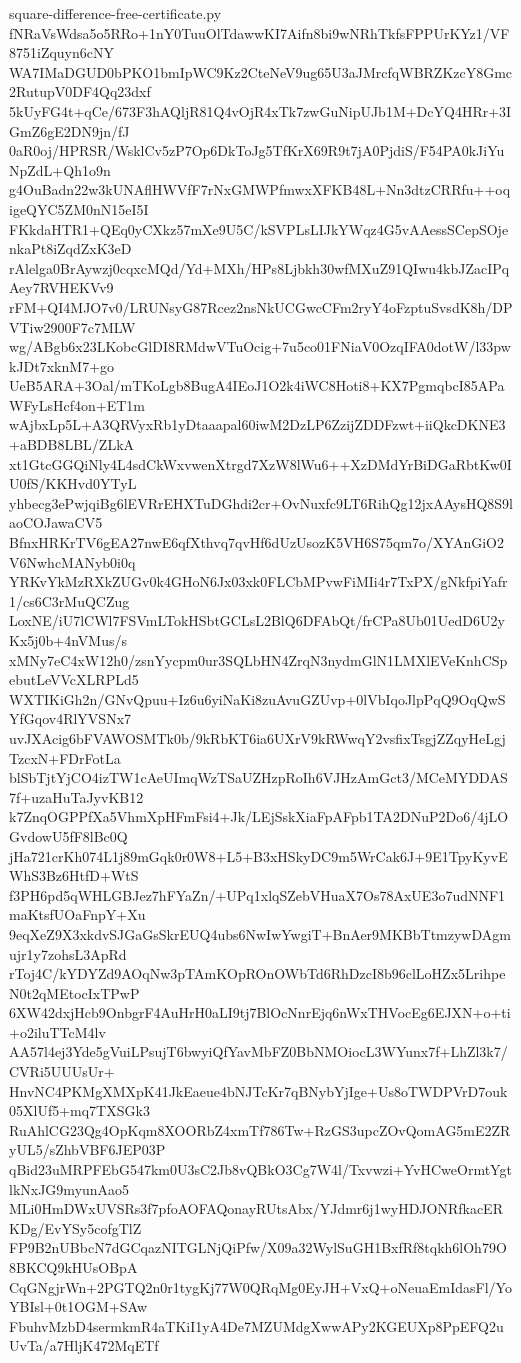 \documentclass[11pt]{article}
\theoremstyle{definition}
\theoremstyle{remark}
\begin{document}
\begin{filecontents*}[overwrite]{square-difference-free-certificate.py}
fNRaVsWdsa5o5RRo+1nY0TuuOlTdawwKI7Aifn8bi9wNRhTkfsFPPUrKYz1/VF8751iZquyn6cNY
WA7IMaDGUD0bPKO1bmIpWC9Kz2CteNeV9ug65U3aJMrcfqWBRZKzcY8Gmc2RutupV0DF4Qq23dxf
5kUyFG4t+qCe/673F3hAQljR81Q4vOjR4xTk7zwGuNipUJb1M+DcYQ4HRr+3IGmZ6gE2DN9jn/fJ
0aR0oj/HPRSR/WsklCv5zP7Op6DkToJg5TfKrX69R9t7jA0PjdiS/F54PA0kJiYuNpZdL+Qh1o9n
g4OuBadn22w3kUNAflHWVfF7rNxGMWPfmwxXFKB48L+Nn3dtzCRRfu++oqigeQYC5ZM0nN15eI5I
FKkdaHTR1+QEq0yCXkz57mXe9U5C/kSVPLsLIJkYWqz4G5vAAessSCepSOjenkaPt8iZqdZxK3eD
rAlelga0BrAywzj0cqxcMQd/Yd+MXh/HPs8Ljbkh30wfMXuZ91QIwu4kbJZacIPqAey7RVHEKVv9
rFM+QI4MJO7v0/LRUNsyG87Rcez2nsNkUCGwcCFm2ryY4oFzptuSvsdK8h/DPVTiw2900F7c7MLW
wg/ABgb6x23LKobcGlDI8RMdwVTuOcig+7u5co01FNiaV0OzqIFA0dotW/l33pwkJDt7xknM7+go
UeB5ARA+3Oal/mTKoLgb8BugA4IEoJ1O2k4iWC8Hoti8+KX7PgmqbcI85APaWFyLsHcf4on+ET1m
wAjbxLp5L+A3QRVyxRb1yDtaaapal60iwM2DzLP6ZzijZDDFzwt+iiQkcDKNE3+aBDB8LBL/ZLkA
xt1GtcGGQiNly4L4sdCkWxvwenXtrgd7XzW8lWu6++XzDMdYrBiDGaRbtKw0IU0fS/KKHvd0YTyL
yhbecg3ePwjqiBg6lEVRrEHXTuDGhdi2cr+OvNuxfc9LT6RihQg12jxAAysHQ8S9laoCOJawaCV5
BfnxHRKrTV6gEA27nwE6qfXthvq7qvHf6dUzUsozK5VH6S75qm7o/XYAnGiO2V6NwhcMANyb0i0q
YRKvYkMzRXkZUGv0k4GHoN6Jx03xk0FLCbMPvwFiMIi4r7TxPX/gNkfpiYafr1/cs6C3rMuQCZug
LoxNE/iU7lCWl7FSVmLTokHSbtGCLsL2BlQ6DFAbQt/frCPa8Ub01UedD6U2yKx5j0b+4nVMus/s
xMNy7eC4xW12h0/zsnYycpm0ur3SQLbHN4ZrqN3nydmGlN1LMXlEVeKnhCSpebutLeVVcXLRPLd5
WXTIKiGh2n/GNvQpuu+Iz6u6yiNaKi8zuAvuGZUvp+0lVbIqoJlpPqQ9OqQwSYfGqov4RlYVSNx7
uvJXAcig6bFVAWOSMTk0b/9kRbKT6ia6UXrV9kRWwqY2vsfixTsgjZZqyHeLgjTzcxN+FDrFotLa
blSbTjtYjCO4izTW1cAeUImqWzTSaUZHzpRoIh6VJHzAmGct3/MCeMYDDAS7f+uzaHuTaJyvKB12
k7ZnqOGPPfXa5VhmXpHFmFsi4+Jk/LEjSskXiaFpAFpb1TA2DNuP2Do6/4jLOGvdowU5fF8lBc0Q
jHa721crKh074L1j89mGqk0r0W8+L5+B3xHSkyDC9m5WrCak6J+9E1TpyKyvEWhS3Bz6HtfD+WtS
f3PH6pd5qWHLGBJez7hFYaZn/+UPq1xlqSZebVHuaX7Os78AxUE3o7udNNF1maKtsfUOaFnpY+Xu
9eqXeZ9X3xkdvSJGaGsSkrEUQ4ubs6NwIwYwgiT+BnAer9MKBbTtmzywDAgmujr1y7zohsL3ApRd
rToj4C/kYDYZd9AOqNw3pTAmKOpROnOWbTd6RhDzcI8b96clLoHZx5LrihpeN0t2qMEtocIxTPwP
6XW42dxjHcb9OnbgrF4AuHrH0aLI9tj7BlOcNnrEjq6nWxTHVocEg6EJXN+o+ti+o2iluTTcM4lv
AA57l4ej3Yde5gVuiLPsujT6bwyiQfYavMbFZ0BbNMOiocL3WYunx7f+LhZl3k7/CVRi5UUUsUr+
HnvNC4PKMgXMXpK41JkEaeue4bNJTcKr7qBNybYjIge+Us8oTWDPVrD7ouk05XlUf5+mq7TXSGk3
RuAhlCG23Qg4OpKqm8XOORbZ4xmTf786Tw+RzGS3upcZOvQomAG5mE2ZRyUL5/sZhbVBF6JEP03P
qBid23uMRPFEbG547km0U3sC2Jb8vQBkO3Cg7W4l/Txvwzi+YvHCweOrmtYgtlkNxJG9myunAao5
MLi0HmDWxUVSRs3f7pfoAOFAQonayRUtsAbx/YJdmr6j1wyHDJONRfkacERKDg/EvYSy5cofgTlZ
FP9B2nUBbcN7dGCqazNITGLNjQiPfw/X09a32WylSuGH1BxfRf8tqkh6lOh79O8BKCQ9kHUsOBpA
CqGNgjrWn+2PGTQ2n0r1tygKj77W0QRqMg0EyJH+VxQ+oNeuaEmIdasFl/YoYBIsl+0t1OGM+SAw
FbuhvMzbD4sermkmR4aTKiI1yA4De7MZUMdgXwwAPy2KGEUXp8PpEFQ2uUvTa/a7HljK472MqETf

\end{filecontents*}
\end{document}
